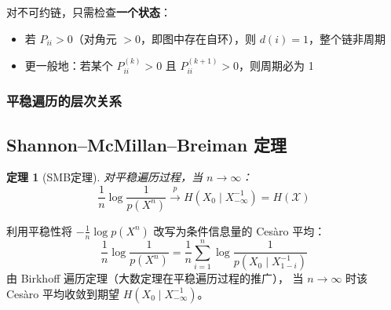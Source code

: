 \documentclass[12pt,a4paper]{ctexart}
\newtheorem{theorem}{定理}[section]
\theoremstyle{definition}
\newcommand{\XX}{\mathcal{X}}
\begin{document}
\begin{keybox}[非周期性的实用判据]
对不可约链，只需检查\textbf{一个状态}：
\begin{itemize}[nosep]
  \item 若 $P_{ii} > 0$（对角元 $>0$，即图中存在自环），则 $d(i)=1$，整个链非周期
  \item 更一般地：若某个 $P^{(k)}_{ii} > 0$ 且 $P^{(k+1)}_{ii} > 0$，则周期必为 1
\end{itemize}
\end{keybox}

\subsubsection{平稳遍历的层次关系}

\begin{center}
\end{center}

\subsection{Shannon–McMillan–Breiman 定理}

\begin{theorem}[SMB定理]
对平稳遍历过程，当 $n \to \infty$：
\[
\frac{1}{n}\log\frac{1}{p(X^n)} \xrightarrow{p} H(X_0 \mid X_{-\infty}^{-1}) = H(\XX)
\]
\end{theorem}

\begin{proofbox}[证明思路]
利用平稳性将 $-\frac{1}{n}\log p(X^n)$ 改写为条件信息量的 Ces\`{a}ro 平均：
\[
\frac{1}{n}\log\frac{1}{p(X^n)}
= \frac{1}{n}\sum_{i=1}^{n} \log\frac{1}{p(X_0 \mid X_{1-i}^{-1})}
\]
由 Birkhoff 遍历定理（大数定理在平稳遍历过程的推广），
当 $n \to \infty$ 时该 Ces\`{a}ro 平均收敛到期望 $H(X_0 \mid X_{-\infty}^{-1})$。
\end{proofbox}
\end{document}

